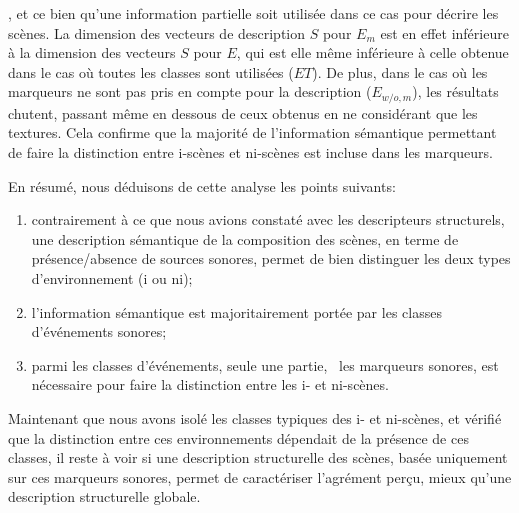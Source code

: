   , et ce bien qu'une information partielle soit utilisée dans ce cas pour décrire les scènes. La dimension des vecteurs de description $S$ pour $E_m$ est en effet inférieure à la dimension des vecteurs $S$ pour $E$, qui est elle même inférieure à celle obtenue dans le cas où toutes les classes sont utilisées ($ET$). De plus, dans le cas où les marqueurs ne sont pas pris en compte pour la description ($E_{w/o,m}$), les résultats chutent, passant même en dessous de ceux obtenus en ne considérant que les textures. Cela confirme que la majorité de l'information sémantique permettant de faire la distinction entre i-scènes et ni-scènes est incluse dans les marqueurs.

En résumé, nous déduisons de cette analyse les points suivants:

\begin{enumerate}
\item contrairement à ce que nous avions constaté avec les descripteurs structurels, une description sémantique de la composition des scènes, en terme de présence/absence de sources sonores, permet de bien distinguer les deux types d'environnement (i ou ni);
\item l'information sémantique est majoritairement portée par les classes d'événements sonores;
\item parmi les classes d'événements, seule une partie, \ie~les marqueurs sonores, est nécessaire pour faire la distinction entre les i- et ni-scènes.
\end{enumerate}

Maintenant que nous avons isolé les classes typiques des i- et ni-scènes, et vérifié que la distinction entre ces environnements dépendait de la présence de ces classes, il reste à voir si une description structurelle des scènes, basée uniquement sur ces marqueurs sonores, permet de caractériser l'agrément perçu, mieux qu'une description structurelle globale. 

